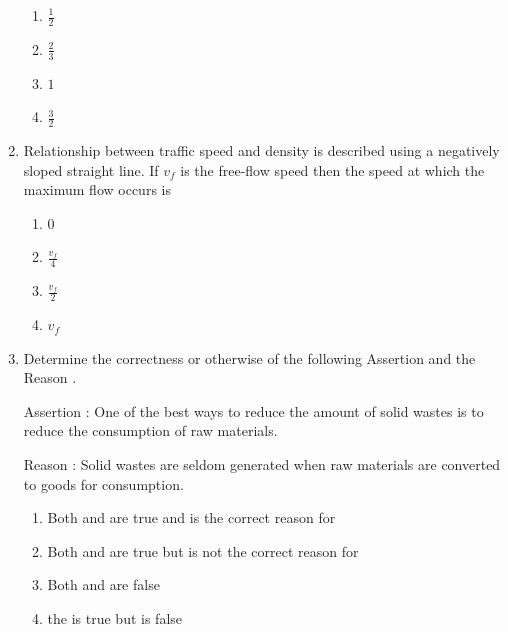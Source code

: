 \documentclass[journal,12pt,onecolumn]{article}
\theoremstyle{remark}
\begin{document}
\begin{enumerate}
\hfill{}

\begin{multicols}{2}
\begin{enumerate}
    \item $\frac{1}{2}$
    \item $\frac{2}{3}$
    \item $1$
    \item $\frac{3}{2}$
\end{enumerate}
\end{multicols}

\item Relationship between traffic speed and density is described using a negatively sloped straight line. If $v_f$ is the free-flow speed then the speed at which the maximum flow occurs is

\hfill{}

\begin{multicols}{2}
\begin{enumerate}
    \item $0$
    \item $\frac{v_f}{4}$
    \item $\frac{v_f}{2}$
    \item $v_f$
\end{enumerate}
\end{multicols}

\item Determine the correctness or otherwise of the following Assertion  and the Reason .

Assertion : One of the best ways to reduce the amount of solid wastes is to reduce the consumption of raw materials.

Reason : Solid wastes are seldom generated when raw materials are converted to goods for consumption.

\hfill{}

\begin{enumerate}
    \item Both  and  are true and  is the correct reason for 
    \item Both  and  are true but  is not the correct reason for 
    \item Both  and  are false
    \item the  is true but  is false
\end{enumerate}


\end{enumerate}
\end{document}
